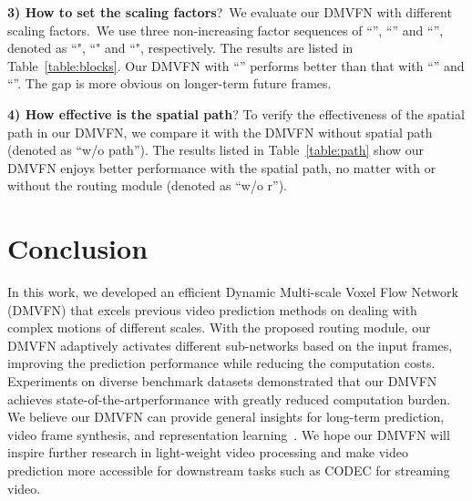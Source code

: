 \documentclass[10pt,twocolumn,letterpaper]{article}
\newcommand{\sota}{state-of-the-art}
\begin{document}
\noindent
\textbf{3) How to set the scaling factors}?\ We evaluate our DMVFN with different scaling factors.\ We use three non-increasing factor sequences of ``'', ``'' and ``'', denoted as ``", ``" and ``", respectively. The results are listed in Table~\ref{table:blocks}. Our DMVFN with ``'' performs better than that with ``'' and ``''. The gap is more obvious on longer-term future frames.

\begin{table}[th]
\caption{\textbf{Spatial path is effective in our DMVFN}. The evaluation metric is MS-SSIM ().}

\centering
{}
\label{table:path}
\end{table}

\noindent
\textbf{4) How effective is the spatial path}? To verify the effectiveness of the spatial path in our DMVFN, we compare it with the DMVFN without spatial path (denoted as ``w/o path''). The results listed in Table~\ref{table:path} show our DMVFN enjoys better performance with the spatial path, no matter with or without the routing module (denoted as ``w/o r'').

 	\section{Conclusion}
 
In this work, we developed an efficient Dynamic Multi-scale Voxel Flow Network (DMVFN) that excels previous video prediction methods on dealing with complex motions of different scales. With the proposed routing module, our DMVFN adaptively activates different sub-networks based on the input frames, improving the prediction performance while reducing the computation costs. Experiments on diverse benchmark datasets demonstrated that our DMVFN achieves \sota performance with greatly reduced computation burden. We believe our DMVFN can provide general insights for long-term prediction, video frame synthesis, and representation learning~\cite{hafner2023mastering,ha2018world}. We hope our DMVFN will inspire further research in light-weight video processing and make video prediction more accessible for downstream tasks such as CODEC for streaming video.
\end{document}
